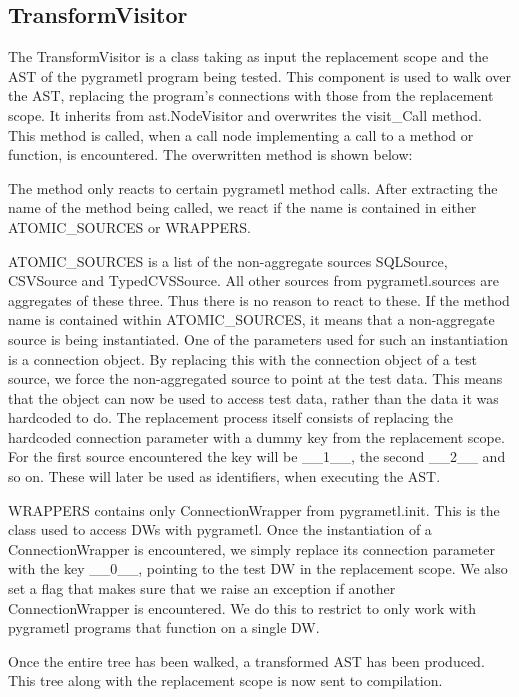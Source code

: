 \subsection{TransformVisitor}
The TransformVisitor is a class taking as input the replacement scope and the AST of the pygrametl program being tested. This component is used to walk over the AST, replacing the program's connections with those from the replacement scope. It inherits from ast.NodeVisitor and overwrites the visit\_Call method. This method is called, when a call node implementing a call to a method or function, is encountered. The overwritten method is shown below:



The method only reacts to certain pygrametl method calls. After extracting the name of the method being called, we react if the name is contained in either ATOMIC\_SOURCES or WRAPPERS.

ATOMIC\_SOURCES is a list of the non-aggregate sources SQLSource, CSVSource and TypedCVSSource. All other sources from pygrametl.sources are aggregates of these three. Thus there is no reason to react to these. If the method name is contained within ATOMIC\_SOURCES, it means that a non-aggregate source is being instantiated. One of the parameters used for such an instantiation is a connection object. By replacing this with the connection object of a test source, we force the non-aggregated source to point at the test data. This means that the object can now be used to access test data, rather than the data it was hardcoded to do. The replacement process itself consists of replacing the hardcoded connection parameter with a dummy key from the replacement scope. For the first source encountered the key will be \_\_1\_\_, the second \_\_2\_\_ and so on. These will later be used as identifiers, when executing the AST.

WRAPPERS contains only ConnectionWrapper from pygrametl.init. This is the class used to access DWs with pygrametl. Once the instantiation of a ConnectionWrapper is encountered, we simply replace its connection parameter with the key \_\_0\_\_, pointing to the test DW in the replacement scope. We also set a flag that makes sure that we raise an exception if another ConnectionWrapper is encountered. We do this to restrict \FW{} to only work with pygrametl programs that function on a single DW.

Once the entire tree has been walked, a transformed AST has been produced. This tree along with the replacement scope is now sent to compilation.


